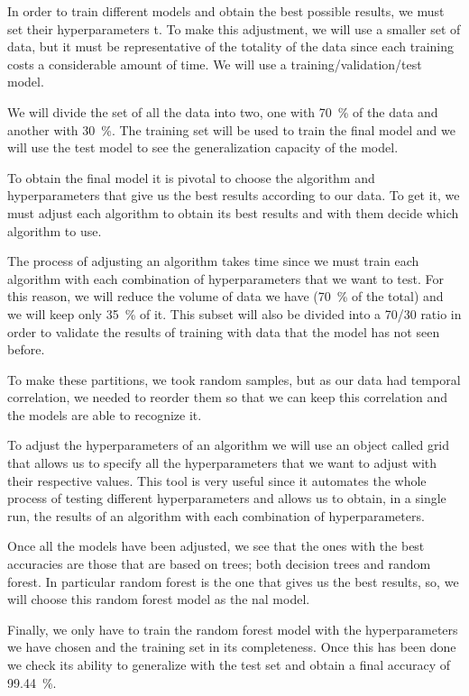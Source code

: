  In order to train different models and obtain the best possible results, we must set their hyperparameters t. To make this adjustment, we will use a smaller set of data, but it must be representative of the totality of the data since each training costs a considerable amount of time. We will use a training/validation/test model.


We will divide the set of all the data into two, one with \SI{70}{\percent} of the data and another with \SI{30}{\percent}. The training set will be used to train the final model and we will use the test model to see the generalization capacity of the model.


To obtain the final model it is pivotal to choose the algorithm and hyperparameters that give us the best results according to our data. To get it, we must adjust each algorithm to obtain its best results and with them decide which algorithm to use.


 The process of adjusting an algorithm takes time since we must train each algorithm with each combination of hyperparameters that we want to test. For this reason, we will reduce the volume of data we have (\SI{70}{\percent} of the total) and we will keep only \SI{35}{\percent} of it. This subset will also be divided into a 70/30 ratio in order to validate the results of training with data that the model has not seen before.


 To make these partitions, we took random samples, but as our data had temporal correlation, we needed to reorder them so that we can keep this correlation and the models are able to recognize it. 


To adjust the hyperparameters of an algorithm we will use an object called grid that allows us to specify all the hyperparameters that we want to adjust with their respective values. This tool is very useful since it automates the whole process of testing different hyperparameters and allows us to obtain, in a single run, the results of an algorithm with each combination of hyperparameters.


Once all the models have been adjusted, we see that the ones with the best accuracies are those that are based on trees; both decision trees and random forest. In particular random forest is the one that gives us the best results, so, we will choose this random forest model as the nal model. 


Finally, we only have to train the random forest model with the hyperparameters we have chosen and the training set in its completeness. Once this has been done we check its ability to generalize with the test set and obtain a final accuracy of \SI{99.44}{\percent}. 


